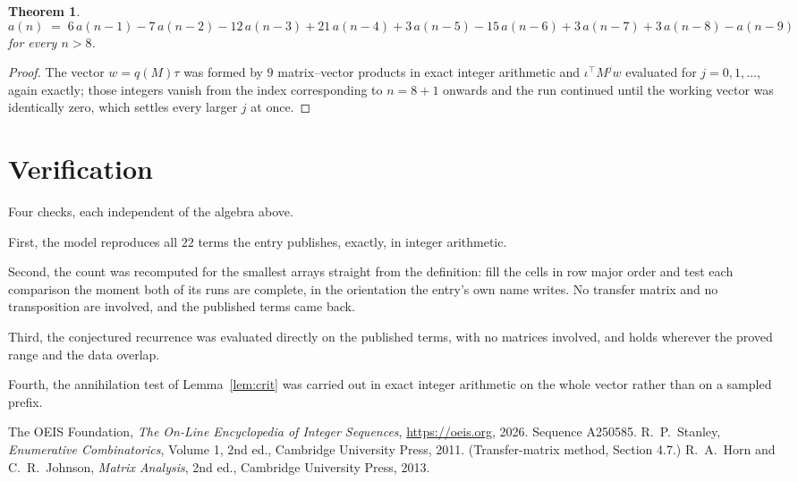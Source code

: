 \documentclass[11pt,a4paper]{article}
\theoremstyle{plain}
\newtheorem{theorem}{Theorem}
\theoremstyle{definition}
\begin{document}
\begin{theorem}
\[
a(n)\;=\;6\,a(n-1) - 7\,a(n-2) - 12\,a(n-3) + 21\,a(n-4) + 3\,a(n-5) - 15\,a(n-6) + 3\,a(n-7) + 3\,a(n-8) - a(n-9)
\]
for every $n>8$.
\end{theorem}

\begin{proof}
The vector $w=q(M)\tau$ was formed by $9$ matrix--vector products in exact integer
arithmetic and $\iota^{\!\top}M^{j}w$ evaluated for $j=0,1,\dots$, again exactly; those
integers vanish from the index corresponding to $n=8+1$ onwards and the run continued
until the working vector was identically zero, which settles every larger $j$ at once.
\end{proof}

\section{Verification}

Four checks, each independent of the algebra above.

First, the model reproduces all $22$ terms the entry publishes, exactly, in integer
arithmetic.

Second, the count was recomputed for the smallest arrays straight from the definition: fill the
cells in row major order and test each comparison the moment both of its runs are complete,
in the orientation the entry's own name writes. No transfer matrix and no transposition are
involved, and the published terms came back.

Third, the conjectured recurrence was evaluated directly on the published terms, with no
matrices involved, and holds wherever the proved range and the data overlap.

Fourth, the annihilation test of Lemma~\ref{lem:crit} was carried out in exact integer
arithmetic on the whole vector rather than on a sampled prefix.

\begin{thebibliography}{9}
 The OEIS Foundation, \emph{The On-Line Encyclopedia of Integer
Sequences}, \url{https://oeis.org}, 2026. Sequence A250585.
 R.~P.~Stanley, \emph{Enumerative Combinatorics}, Volume 1, 2nd ed.,
Cambridge University Press, 2011. (Transfer-matrix method, Section 4.7.)
 R.~A.~Horn and C.~R.~Johnson, \emph{Matrix Analysis}, 2nd ed., Cambridge
University Press, 2013.
\end{thebibliography}
\end{document}
